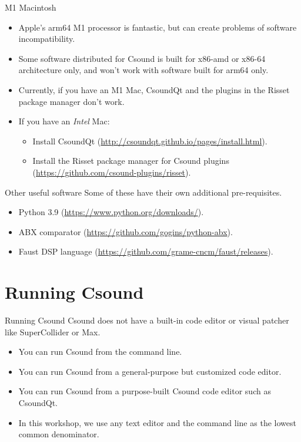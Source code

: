 \documentclass{beamer}
\begin{document}
\begin{frame}{M1 Macintosh}
\begin{itemize}
\item Apple's arm64 M1 processor is fantastic, but can create problems of software incompatibility.
\item Some software distributed for Csound is built for x86-amd or x86-64 architecture only, and won't work with software built for arm64 only.
\item Currently, if you have an M1 Mac, CsoundQt and the plugins in the Risset package manager don't work.
\item If you have an \emph{Intel} Mac:
\begin{itemize}
\item Install CsoundQt (\url{http://csoundqt.github.io/pages/install.html}).
\item Install the Risset package manager for Csound plugins (\url{https://github.com/csound-plugins/risset}). 
\end{itemize}
\end{itemize}
\end{frame}

\begin{frame}{Other useful software}
Some of these have their own additional pre-requisites.
\begin{itemize}
\item Python 3.9 (\url{https://www.python.org/downloads/}).
\item ABX comparator (\url{https://github.com/gogins/python-abx}).
\item Faust DSP language (\url{https://github.com/grame-cncm/faust/releases}).
\end{itemize}
\end{frame}

\section{Running Csound}
\begin{frame}{Running Csound}
Csound does not have a built-in code editor or visual patcher like SuperCollider or Max.
\begin{itemize}
\item You can run Csound from the command line.
\item You can run Csound from a general-purpose but customized code editor.
\item You can run Csound from a purpose-built Csound code editor such as CsoundQt.
\item In this workshop, we use any text editor and the command line as the lowest common denominator.
\end{itemize}
\end{frame}
\end{document}
